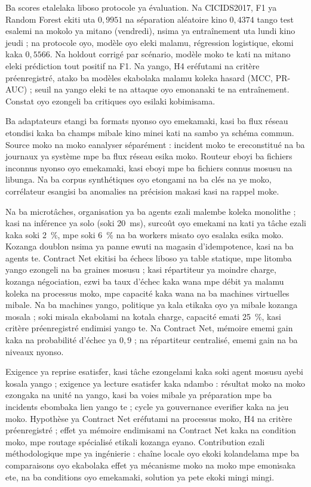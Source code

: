 \documentclass[12pt,a4paper,oneside]{report}
\begin{document}
Ba scores etalelaka liboso protocole ya évaluation. Na CICIDS2017, F1 ya
Random Forest ekiti uta $0{,}9951$ na séparation aléatoire kino
$0{,}4374$ tango test esalemi na mokolo ya mitano (vendredi), nsima ya
entraînement uta lundi kino jeudi ; na protocole oyo, modèle oyo eleki
malamu, régression logistique, ekomi kaka $0{,}5566$. Na holdout corrigé
par scénario, modèle moko te kati na mitano eleki prédiction tout
positif na F1. Na yango, H4 eréfutami na critère préenregistré, atako ba
modèles ekabolaka malamu koleka hasard (MCC, PR-AUC) ; seuil na yango
eleki te na attaque oyo emonanaki te na entraînement. Constat oyo ezongeli
ba critiques oyo esilaki kobimisama.

Ba adaptateurs etangi ba formats nyonso oyo emekamaki, kasi ba flux réseau
etondisi kaka ba champs mibale kino minei kati na sambo ya schéma commun. Source moko na moko
eanalyser séparément : incident moko te ereconstitué na ba journaux ya
système mpe ba flux réseau esika moko. Routeur eboyi ba fichiers inconnus
nyonso oyo emekamaki, kasi eboyi mpe ba fichiers connus mosusu na
libunga. Na ba corpus synthétiques oyo etongami na ba clés na ye moko,
corrélateur esangisi ba anomalies na précision makasi kasi na rappel
moke.

Na ba microtâches, organisation ya ba agents ezali malembe koleka
monolithe ; kasi na inférence ya solo (soki 20~ms), surcoût oyo emekami na kati
ya tâche ezali kaka soki 2~\%, mpe soki 6~\% na ba workers misato oyo esalaka
esika moko. Kozanga doublon nsima ya panne ewuti na magasin d'idempotence,
kasi na ba agents te. Contract Net ekitisi ba échecs liboso ya table
statique, mpe litomba yango ezongeli na ba graines mosusu ; kasi
répartiteur ya moindre charge, kozanga négociation, ezwi ba taux d'échec
kaka wana mpe débit ya malamu koleka na processus moko, mpe capacité kaka
wana na ba machines virtuelles mibale. Na ba machines yango, politique ya
kala etikaka oyo ya mibale kozanga mosala ; soki misala ekabolami na kotala
charge, capacité emati 25~\%, kasi critère préenregistré endimisi yango te.
Na Contract Net, mémoire ememi gain kaka na probabilité d'échec ya
$0{,}9$ ; na répartiteur centralisé, ememi gain na ba niveaux nyonso.

Exigence ya reprise esatisfer, kasi tâche ezongelami kaka soki agent mosusu
ayebi kosala yango ; exigence ya lecture esatisfer kaka ndambo : résultat
moko na moko ezongaka na unité na yango, kasi ba voies mibale ya préparation
mpe ba incidents ebombaka lien yango te ; cycle ya gouvernance everifier kaka na jeu moko. Hypothèse ya
Contract Net eréfutami na processus moko, H4 na critère préenregistré ; effet
ya mémoire endimisami na Contract Net kaka na condition moko, mpe routage spécialisé etikali kozanga eyano. Contribution ezali
méthodologique mpe ya ingénierie : chaîne locale oyo ekoki kolandelama
mpe ba comparaisons oyo ekabolaka effet ya mécanisme moko na moko mpe
emonisaka ete, na ba conditions oyo emekamaki, solution ya pete ekoki
mingi mingi.
\end{document}
